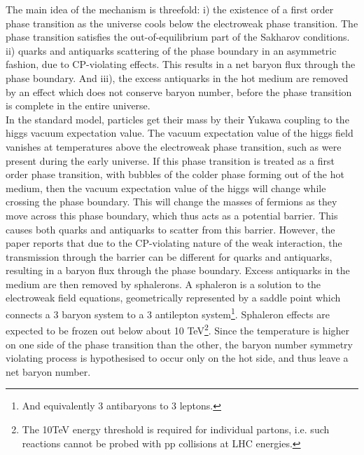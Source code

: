 The main idea of the mechanism is threefold: i) the existence of a first order phase transition as the universe cools below the electroweak phase transition. The phase transition satisfies the out-of-equilibrium part of the Sakharov conditions. ii) quarks and antiquarks scattering of the phase boundary in an asymmetric fashion, due to CP-violating effects. This results in a net baryon flux through the phase boundary. And iii), the excess antiquarks in the hot medium are removed by an effect which does not conserve baryon number, before the phase transition is complete in the entire universe. \\
In the standard model, particles get their mass by their Yukawa coupling to the higgs vacuum expectation value. The vacuum expectation value of the higgs field vanishes at temperatures above the electroweak phase transition, such as were present during the early universe\cite{Higgs_vev_highT}. If this phase transition is treated as a first order phase transition, with bubbles of the colder phase forming out of the hot medium, then the vacuum expectation value of the higgs will change while crossing the phase boundary. This will change the masses of fermions as they move across this phase boundary, which thus acts as a potential barrier. This causes both quarks and antiquarks to scatter from this barrier. However, the paper reports that due to the CP-violating nature of the weak interaction, the transmission through the barrier can be different for quarks and antiquarks, resulting in a baryon flux through the phase boundary. Excess antiquarks in the medium are then removed by sphalerons. A sphaleron is a solution to the electroweak field equations, geometrically represented by a saddle point which connects a 3 baryon system to a 3 antilepton system\footnote{And equivalently 3 antibaryons to 3 leptons.}\cite{}. Sphaleron effects are expected to be frozen out below about 10 TeV\footnote{The 10TeV energy threshold is required for individual partons, i.e. such reactions cannot be probed with pp collisions at LHC energies.}. Since the temperature is higher on one side of the phase transition than the other, the baryon number symmetry violating process is hypothesised to occur only on the hot side, and thus leave a net baryon number.   


